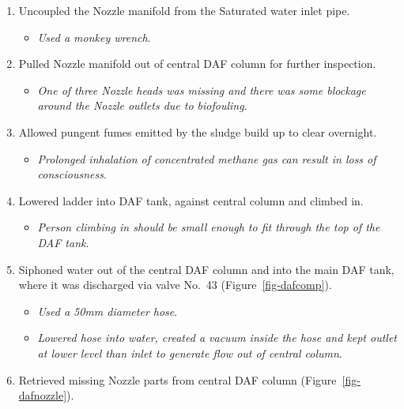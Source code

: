 \documentclass[
  letterpaper,
  DIV=11,
  numbers=noendperiod]{scrreprt}
\providecommand{\tightlist}{%
  \setlength{\itemsep}{0pt}\setlength{\parskip}{0pt}}\usepackage{longtable,booktabs,array}
\begin{document}
\begin{enumerate}
\def\labelenumi{\arabic{enumi}.}
\setcounter{enumi}{8}
\tightlist
\item
  Uncoupled the Nozzle manifold from the Saturated water inlet pipe.

  \begin{itemize}
  \tightlist
  \item
    \emph{Used a monkey wrench}.
  \end{itemize}
\item
  Pulled Nozzle manifold out of central DAF column for further
  inspection.

  \begin{itemize}
  \tightlist
  \item
    \emph{One of three Nozzle heads was missing and there was some
    blockage around the Nozzle outlets due to biofouling}.
  \end{itemize}
\item
  Allowed pungent fumes emitted by the sludge build up to clear
  overnight.

  \begin{itemize}
  \tightlist
  \item
    \emph{Prolonged inhalation of concentrated methane gas can result in
    loss of consciousness}.
  \end{itemize}
\item
  Lowered ladder into DAF tank, against central column and climbed in.

  \begin{itemize}
  \tightlist
  \item
    \emph{Person climbing in should be small enough to fit through the
    top of the DAF tank}.
  \end{itemize}
\item
  Siphoned water out of the central DAF column and into the main DAF
  tank, where it was discharged via valve No.~43
  (Figure~\ref{fig-dafcomp}).

  \begin{itemize}
  \tightlist
  \item
    \emph{Used a 50mm diameter hose}.
  \item
    \emph{Lowered hose into water, created a vacuum inside the hose and
    kept outlet at lower level than inlet to generate flow out of
    central column}.
  \end{itemize}
\item
  Retrieved missing Nozzle parts from central DAF column
  (Figure~\ref{fig-dafnozzle}).


\end{enumerate}
\end{document}
